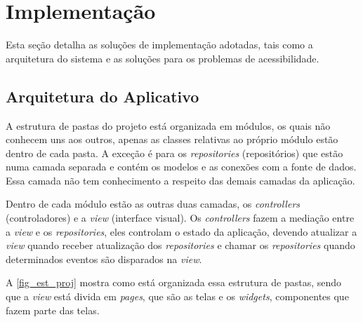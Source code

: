 \section{Implementação}

Esta seção detalha as soluções de implementação adotadas, tais como a arquitetura do sistema e as soluções
para os problemas de acessibilidade.

\subsection{Arquitetura do Aplicativo}

A estrutura de pastas do projeto está organizada em módulos, os quais não conhecem uns aos outros,
apenas as classes relativas ao próprio módulo estão dentro de cada pasta. A exceção é para os \emph{repositories} (repositórios)
que estão numa camada separada e contém os modelos e as conexões com a fonte de dados.
Essa camada não tem conhecimento a respeito das demais camadas da aplicação.

Dentro de cada módulo estão as outras duas camadas, os \emph{controllers} (controladores) e a \emph{view} (interface visual).
Os \emph{controllers} fazem a mediação entre a \emph{view} e os \emph{repositories}, eles controlam o estado da aplicação,
devendo atualizar a \emph{view} quando receber atualização dos \emph{repositories} e chamar os \emph{repositories}
quando determinados eventos são disparados na \emph{view}.

A \autoref{fig_est_proj} mostra como está organizada essa estrutura de pastas, sendo que a \emph{view}
está divida em \emph{pages}, que são as telas e os \emph{widgets}, componentes que fazem parte das telas.

\newpage

